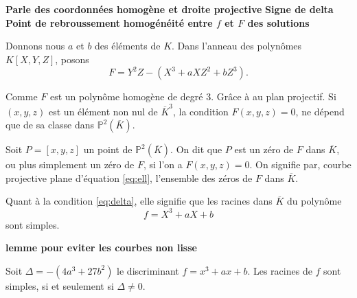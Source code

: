 \textbf{Parle des coordonnées homogène et droite projective}
\textbf{Signe de delta}
\textbf{Point de rebroussement}
\textbf{homogénéité entre $f$ et $F$ des solutions}

Donnons nous $a$ et $b$ des éléments de $K$. Dans l'anneau des polynômes $K\left[ X,Y,Z \right] $, posons 
\[
F=Y^2Z-\left( X^3+aXZ^2+bZ^3 \right) 
.\] 

Comme $F$ est un polynôme homogène de degré $3$. Grâce à au plan projectif. Si $(x,y,z)$ est
un élément non nul de $\overline{K}^3$, la condition $F(x,y,z) = 0$, ne dépend que de sa classe
dans $\mathbb{P}^2(\overline{K})$.

Soit $P = \left[ x,y,z \right] $ un point de $\mathbb{P}^2(\overline{K})$. On
dit que $P$ est un zéro de $F$ dans $\overline{K}$, ou plus simplement un zéro de $F$, si
l'on a $F(x,y,z)=0$. On signifie par, courbe projective plane d'équation \eqref{eq:ell},
l'ensemble des zéros de $F$ dans $\overline{K}$.

Quant à la condition \eqref{eq:delta}, elle signifie que les racines dans $\overline{K}$ du
polynôme
\[
f = X^3 + aX + b
\] 
sont simples.

\textbf{lemme pour eviter les courbes non lisse}

\begin{lemme}
    \label{lem:lemme1}
    Soit $\Delta= -(4a^3 + 27b^2)$ le discriminant $f = x^3 + ax + b$. 
    Les racines de $f$ sont simples, si et seulement si $\Delta \neq 0$.
\end{lemme}

